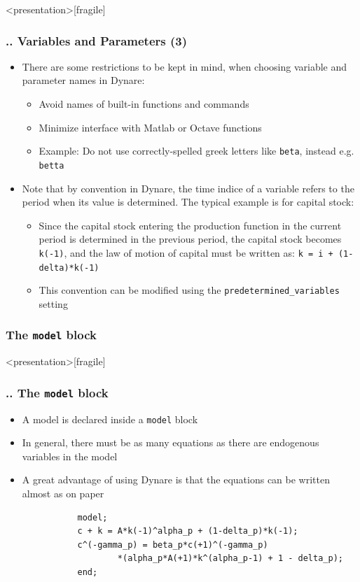 \documentclass[11pt,aspectratio=169]{beamer}
\begin{document}
\begin{frame}<presentation>[fragile]
	\frametitle{{\thesection.\thesubsection.\thesubsubsection} Variables and Parameters (3)}
	\begin{itemize}
		\item There are some restrictions to be kept in mind, when choosing variable and parameter names in Dynare:
			\begin{itemize} 
				\item Avoid names of built-in functions and commands
				\item Minimize interface with Matlab or Octave functions
				\item Example: Do not use correctly-spelled greek letters like \texttt{beta}, instead \linebreak e.g. \texttt{betta}
			\end{itemize}
		\item Note that by convention in Dynare, the time indice of a variable refers to the period when its value is determined. The typical example is for capital stock:
			\begin{itemize}
				\item Since the capital stock entering the production function in the current period is determined in the previous period, the capital stock becomes \texttt{k(-1)}, and the law of motion of capital must be written as: \texttt{k = i + (1-delta)*k(-1)} 
				\item This convention can be modified using the \texttt{predetermined\_variables} setting
			\end{itemize}
	\end{itemize}
\end{frame}
\subsubsection{The \texttt{model} block}
\begin{frame}<presentation>[fragile]
	\frametitle{{\thesection.\thesubsection.\thesubsubsection} The \texttt{model} block}
	\begin{itemize}
		\item A model is declared inside a \texttt{model} block 
		\item In general, there must be as many equations as there are endogenous variables in the model 
		\item A great advantage of using Dynare is that the equations can be written almost as on paper
		\begin{verbatim}
		   model;
		   c + k = A*k(-1)^alpha_p + (1-delta_p)*k(-1);
		   c^(-gamma_p) = beta_p*c(+1)^(-gamma_p)
		           *(alpha_p*A(+1)*k^(alpha_p-1) + 1 - delta_p);
		   end;
		\end{verbatim}
	\end{itemize}
\end{frame}
\end{document}
